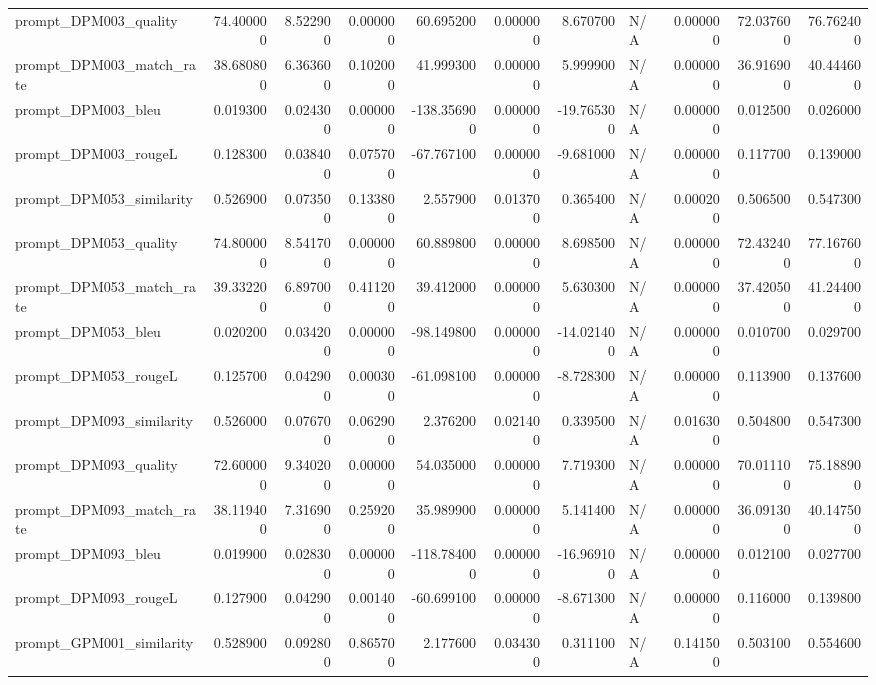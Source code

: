 \begin{tabular}{lrrrrrrlrrr}
prompt_DPM003_quality & 74.400000 & 8.522900 & 0.000000 & 60.695200 & 0.000000 & 8.670700 & N/A & 0.000000 & 72.037600 & 76.762400 \\
prompt_DPM003_match_rate & 38.680800 & 6.363600 & 0.102000 & 41.999300 & 0.000000 & 5.999900 & N/A & 0.000000 & 36.916900 & 40.444600 \\
prompt_DPM003_bleu & 0.019300 & 0.024300 & 0.000000 & -138.356900 & 0.000000 & -19.765300 & N/A & 0.000000 & 0.012500 & 0.026000 \\
prompt_DPM003_rougeL & 0.128300 & 0.038400 & 0.075700 & -67.767100 & 0.000000 & -9.681000 & N/A & 0.000000 & 0.117700 & 0.139000 \\
prompt_DPM053_similarity & 0.526900 & 0.073500 & 0.133800 & 2.557900 & 0.013700 & 0.365400 & N/A & 0.000200 & 0.506500 & 0.547300 \\
prompt_DPM053_quality & 74.800000 & 8.541700 & 0.000000 & 60.889800 & 0.000000 & 8.698500 & N/A & 0.000000 & 72.432400 & 77.167600 \\
prompt_DPM053_match_rate & 39.332200 & 6.897000 & 0.411200 & 39.412000 & 0.000000 & 5.630300 & N/A & 0.000000 & 37.420500 & 41.244000 \\
prompt_DPM053_bleu & 0.020200 & 0.034200 & 0.000000 & -98.149800 & 0.000000 & -14.021400 & N/A & 0.000000 & 0.010700 & 0.029700 \\
prompt_DPM053_rougeL & 0.125700 & 0.042900 & 0.000300 & -61.098100 & 0.000000 & -8.728300 & N/A & 0.000000 & 0.113900 & 0.137600 \\
prompt_DPM093_similarity & 0.526000 & 0.076700 & 0.062900 & 2.376200 & 0.021400 & 0.339500 & N/A & 0.016300 & 0.504800 & 0.547300 \\
prompt_DPM093_quality & 72.600000 & 9.340200 & 0.000000 & 54.035000 & 0.000000 & 7.719300 & N/A & 0.000000 & 70.011100 & 75.188900 \\
prompt_DPM093_match_rate & 38.119400 & 7.316900 & 0.259200 & 35.989900 & 0.000000 & 5.141400 & N/A & 0.000000 & 36.091300 & 40.147500 \\
prompt_DPM093_bleu & 0.019900 & 0.028300 & 0.000000 & -118.784000 & 0.000000 & -16.969100 & N/A & 0.000000 & 0.012100 & 0.027700 \\
prompt_DPM093_rougeL & 0.127900 & 0.042900 & 0.001400 & -60.699100 & 0.000000 & -8.671300 & N/A & 0.000000 & 0.116000 & 0.139800 \\
prompt_GPM001_similarity & 0.528900 & 0.092800 & 0.865700 & 2.177600 & 0.034300 & 0.311100 & N/A & 0.141500 & 0.503100 & 0.554600 \\

\end{tabular}

